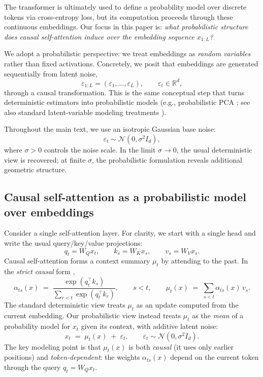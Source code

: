 \documentclass[11pt]{article}
\begin{document}
The transformer is ultimately used to define a probability model over discrete tokens via cross-entropy loss, but its computation proceeds through these continuous embeddings. Our focus in this paper is: \emph{what probabilistic structure does causal self-attention induce over the embedding sequence $x_{1:L}$?}

We adopt a probabilistic perspective: we treat embeddings as \emph{random variables} rather than fixed activations. Concretely, we posit that embeddings are generated sequentially from latent noise,
\[
\varepsilon_{1:L} = (\varepsilon_1,\dots,\varepsilon_L), \qquad \varepsilon_t \in \mathbb{R}^d,
\]
through a causal transformation. This is the same conceptual step that turns deterministic estimators into probabilistic models (e.g., probabilistic PCA \citep{TippingBi99}; see also standard latent-variable modeling treatments \citep{Bishop06,Murphy12}).

Throughout the main text, we use an isotropic Gaussian base noise:
\begin{equation}
\varepsilon_t \sim \mathcal{N}(0,\sigma^2 I_d),
\label{eq:base_noise}
\end{equation}
where $\sigma>0$ controls the noise scale. In the limit $\sigma\to 0$, the usual deterministic view is recovered; at finite $\sigma$, the probabilistic formulation reveals additional geometric structure.

\subsection{Causal self-attention as a probabilistic model over embeddings}
Consider a single self-attention layer. For clarity, we start with a single head and write the usual query/key/value projections:
\[
q_t = W_Q x_t, 
\qquad 
k_s = W_K x_s, 
\qquad 
v_s = W_V x_s.
\]
Causal self-attention forms a context summary $\mu_t$ by attending to the past. In the \emph{strict causal} form \citep{VaswaniShPaUsJoGoKaPo17,BrownMaRyEtAl20},
\begin{equation}
\alpha_{ts}(x)
\;=\;
\frac{\exp\!\left(q_t^\top k_s\right)}{\sum_{r<t}\exp\!\left(q_t^\top k_r\right)},
\qquad s<t,
\qquad
\mu_t(x)
\;=\;
\sum_{s<t} \alpha_{ts}(x)\, v_s .
\label{eq:attn_summary_strict}
\end{equation}
The standard deterministic view treats $\mu_t$ as an update computed from the current embedding. Our probabilistic view instead treats $\mu_t$ as the \emph{mean} of a probability model for $x_t$ given its context, with additive latent noise:
\begin{equation}
x_t \;=\; \mu_t(x) \;+\; \varepsilon_t,
\qquad
\varepsilon_t \sim \mathcal{N}(0,\sigma^2 I_d).
\label{eq:latent_noise_model}
\end{equation}
The key modeling point is that $\mu_t(x)$ is both \emph{causal} (it uses only earlier positions) and \emph{token-dependent}: the weights $\alpha_{ts}(x)$ depend on the current token through the query $q_t=W_Qx_t$.
\end{document}
